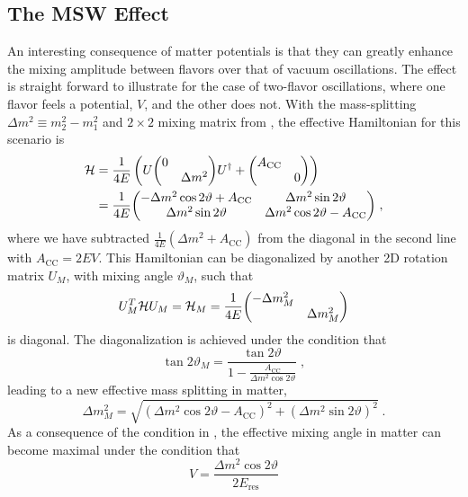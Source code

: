 \subsection{The MSW Effect}
\label{sec:msw-effect}
An interesting consequence of matter potentials is that they can greatly enhance the mixing amplitude between flavors over that of vacuum oscillations.
The effect is straight forward to illustrate for the case of two-flavor oscillations, where one flavor feels a potential, $V$, and the other does not.
With the mass-splitting $\Delta m^2 \equiv m_2^2 - m_1^2$ and $2\times2$ mixing matrix from , the effective Hamiltonian for this scenario is
\begin{equation}
\begin{aligned}
    \mathcal{H}  &= \frac{1}{4E}\left(
        U\mqty(\dmat{0, \Delta m^2})U^\dag + \mqty(\dmat{A_\mathrm{CC}, 0})
    \right)\\
    &= \frac{1}{4E} \mqty(
        -\Delta m^2 \cos 2\vartheta + A_\mathrm{CC} & \Delta m^2 \sin 2\vartheta \\
        \Delta m^2 \sin 2\vartheta & \Delta m^2 \cos 2\vartheta - A_\mathrm{CC}
    )\;,
\end{aligned}
\end{equation}
where we have subtracted $\frac{1}{4E}(\Delta m^2 + A_\mathrm{CC})$ from the diagonal in the second line with $A_\mathrm{CC} = 2E V$.
This Hamiltonian can be diagonalized by another 2D rotation matrix $U_M$, with mixing angle $\vartheta_M$, such that
\begin{equation}
    U_M^T\mathcal{H}U_M = \mathcal{H}_M = \frac{1}{4E}\mqty(\dmat{-\Delta m^2_M, \Delta m^2_M})
\end{equation}
is diagonal.
The diagonalization is achieved under the condition that
\begin{equation}
    \tan 2\vartheta_M = \frac{\tan 2\vartheta}{1 - \frac{A_\mathrm{CC}}{\Delta m^2 \cos 2\vartheta}}\;,\label{eq:msw-condition}
\end{equation}
leading to a new effective mass splitting in matter,
\begin{equation}
    \Delta m^2_M = \sqrt{(\Delta m^2 \cos 2\vartheta - A_\mathrm{CC})^2 + (\Delta m^2\sin 2\vartheta)^2}\;.
\end{equation}
As a consequence of the condition in , the effective mixing angle in matter can become maximal under the condition that
\begin{equation}
    V = \frac{\Delta m^2 \cos 2\vartheta}{2E_\mathrm{res}}\label{eq:msw-pot}
\end{equation}
